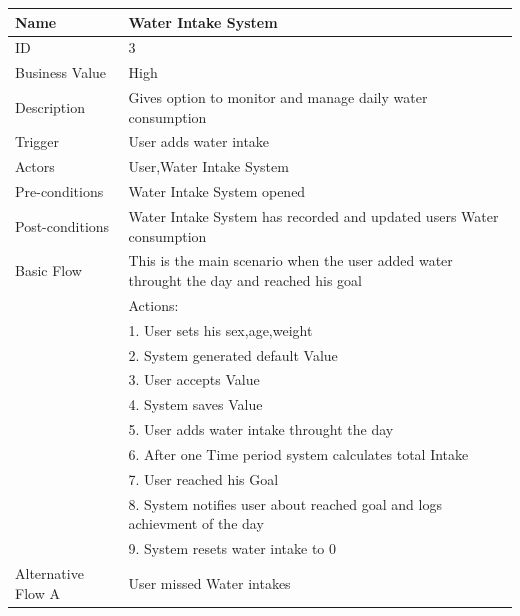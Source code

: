 \documentclass{article}
\begin{document}
\begin{table}[h!]
    \begin{tabularx}{\textwidth}{|>{\raggedright\arraybackslash}p{}|X|}
        \hline
        Name             & Water Intake System                               \\ \hline
        ID               & 3                                                                                     \\ \hline
        Business Value   & High                                                                                    \\ \hline
        Description      & Gives option to monitor and manage daily water consumption \\ \hline
        Trigger          & User adds water intake  \\ \hline
        Actors           & User,Water Intake System                                \\ \hline
        Pre-conditions   & Water Intake System opened                                 \\ \hline
        Post-conditions  & Water Intake System has recorded and updated users Water consumption                                                     \\ \hline
        Basic Flow       & This is the main scenario when the user added water throught the day and reached his goal \\ \hline
                         & Actions: \\
                         & 1. User sets his sex,age,weight\\
                         & 2. System generated default Value \\
                         & 3. User accepts Value \\
                         & 4. System saves Value \\
                         & 5. User adds water intake throught the day\\
                         & 6. After one Time period system calculates total Intake \\
                         & 7. User reached his Goal \\
                         & 8. System notifies user about reached goal and logs achievment of the day\\ 
                         & 9. System resets water intake to 0\\ \hline
        Alternative Flow A & User missed Water intakes  \\

\end{tabularx}
\end{table}
\end{document}
